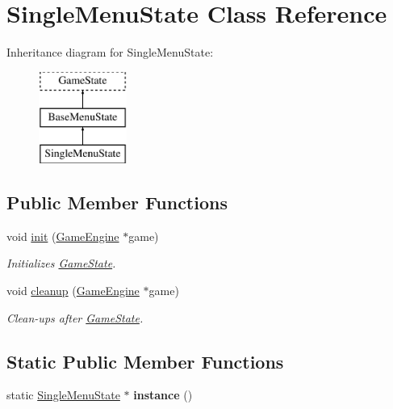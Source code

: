 \hypertarget{class_single_menu_state}{}\section{Single\+Menu\+State Class Reference}
\label{class_single_menu_state}
Inheritance diagram for Single\+Menu\+State\+:\begin{figure}[H]
\begin{center}
\leavevmode
\includegraphics[height=3.000000cm]{class_single_menu_state}
\end{center}
\end{figure}
\subsection*{Public Member Functions}
\begin{DoxyCompactItemize}
\item 
\mbox{\label{class_single_menu_state_a9494d848c97fe4d406f122f3d97bc38d}} 
void \mbox{\hyperlink{class_single_menu_state_a9494d848c97fe4d406f122f3d97bc38d}{init}} (\mbox{\hyperlink{class_game_engine}{Game\+Engine}} $\ast$game)
\begin{DoxyCompactList}\small\item\em Initializes \mbox{\hyperlink{class_game_state}{Game\+State}}. \end{DoxyCompactList}\item 
\mbox{\label{class_single_menu_state_a61fdbb1a47f269d9f99f99ef9312624f}} 
void \mbox{\hyperlink{class_single_menu_state_a61fdbb1a47f269d9f99f99ef9312624f}{cleanup}} (\mbox{\hyperlink{class_game_engine}{Game\+Engine}} $\ast$game)
\begin{DoxyCompactList}\small\item\em Clean-\/ups after \mbox{\hyperlink{class_game_state}{Game\+State}}. \end{DoxyCompactList}\end{DoxyCompactItemize}
\subsection*{Static Public Member Functions}
\begin{DoxyCompactItemize}
\item 
\mbox{\label{class_single_menu_state_a608d05075dbe38e9e9a84b189b89d411}} 
static \mbox{\hyperlink{class_single_menu_state}{Single\+Menu\+State}} $\ast$ {\bfseries instance} ()
\end{DoxyCompactItemize}
